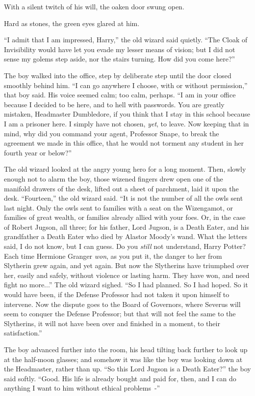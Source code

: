 With a silent twitch of his will, the oaken door swung open.

Hard as stones, the green eyes glared at him.

``I admit that I am impressed, Harry,'' the old wizard said quietly. ``The Cloak of Invisibility would have let you evade my lesser means of vision; but I did not sense my golems step aside, nor the stairs turning. How did you come here?''

The boy walked into the office, step by deliberate step until the door closed smoothly behind him. ``I can go anywhere I choose, with or without permission,'' that boy said. His voice seemed calm; too calm, perhaps. ``I am in your office because I decided to be here, and to hell with passwords. You are greatly mistaken, Headmaster Dumbledore, if you think that I stay in this school because I am a prisoner here. I simply have not chosen, \emph{yet}, to leave. Now keeping that in mind, why did you command your agent, Professor Snape, to break the agreement we made in this office, that he would not torment any student in her fourth year or below?''

The old wizard looked at the angry young hero for a long moment. Then, slowly enough not to alarm the boy, those wizened fingers drew open one of the manifold drawers of the desk, lifted out a sheet of parchment, laid it upon the desk. ``Fourteen,'' the old wizard said. ``It is not the number of all the owls sent last night. Only the owls sent to families with a seat on the Wizengamot, or families of great wealth, or families already allied with your foes. Or, in the case of Robert Jugson, all three; for his father, Lord Jugson, is a Death Eater, and his grandfather a Death Eater who died by Alastor Moody's wand. What the letters said, I do not know, but I can guess. Do you \emph{still} not understand, Harry Potter? Each time Hermione Granger \emph{won}, as you put it, the danger to her from Slytherin grew again, and yet again. But now the Slytherins have triumphed over her, easily and safely, without violence or lasting harm. They have won, and need fight no more...'' The old wizard sighed. ``So I had planned. So I had hoped. So it would have been, if the Defense Professor had not taken it upon himself to intervene. Now the dispute goes to the Board of Governors, where Severus will seem to conquer the Defense Professor; but that will not feel the same to the Slytherins, it will not have been over and finished in a moment, to their satisfaction.''

The boy advanced further into the room, his head tilting back further to look up at the half-moon glasses; and somehow it was like the boy was looking down at the Headmaster, rather than up. ``So this Lord Jugson is a Death Eater?'' the boy said softly. ``Good. His life is already bought and paid for, then, and I can do anything I want to him without ethical problems~-''

